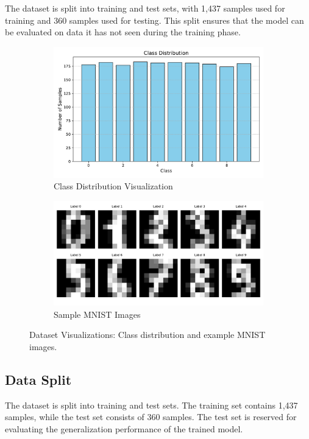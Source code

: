 \documentclass{article}
\begin{document}
The dataset is split into training and test sets, with 1,437 samples used for training and 360 samples used for testing. This split ensures that the model can be evaluated on data it has not seen during the training phase.

\begin{figure}[h]
    \centering
    \begin{subfigure}[b]{0.45\textwidth}
        \includegraphics[width=\textwidth]{images/class_distribution.pdf}
        \caption{Class Distribution Visualization}
        \label{fig:class_distribution}
    \end{subfigure}
    \hfill
    \begin{subfigure}[b]{0.45\textwidth}
        \includegraphics[width=\textwidth]{images/MNIST_samples.pdf}
        \caption{Sample MNIST Images}
        \label{fig:mnist_samples}
    \end{subfigure}
    \caption{Dataset Visualizations: Class distribution and example MNIST images.}
    \label{fig:dataset_visualizations}
\end{figure}

\subsection{Data Split}
The dataset is split into training and test sets. The training set contains 1,437 samples, while the test set consists of 360 samples. The test set is reserved for evaluating the generalization performance of the trained model.
\end{document}
